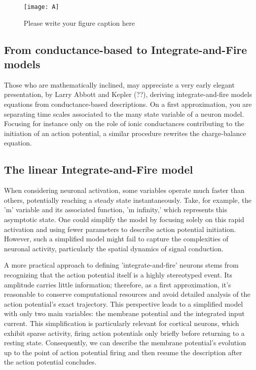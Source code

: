 \begin{figure}[t]
\sidecaption[t]
\centering
\texttt{[image: A]}
\caption{Please write your figure caption here}
\label{fig3:A1}       %
\end{figure}



\subsection{From conductance-based to Integrate-and-Fire models}

Those who are mathematically inclined, may appreciate a very early elegant presentation, by Larry Abbott and Kepler (??), deriving integrate-and-fire models equations from conductance-based descriptions. On a first approximation, you are separating time scales associated to the many state variable of a neuron model. Focusing for instance only on the role of ionic conductances contributing to the initiation of an action potential, a similar procedure rewrites the charge-balance equation.

\subsection{The linear Integrate-and-Fire model}

When considering neuronal activation, some variables operate much faster than others, potentially reaching a steady state instantaneously. Take, for example, the 'm' variable and its associated function, 'm infinity,' which represents this asymptotic state. One could simplify the model by focusing solely on this rapid activation and using fewer parameters to describe action potential initiation. However, such a simplified model might fail to capture the complexities of neuronal activity, particularly the spatial dynamics of signal conduction.

A more practical approach to defining 'integrate-and-fire' neurons stems from recognizing that the action potential itself is a highly stereotyped event. Its amplitude carries little information; therefore, as a first approximation, it's reasonable to conserve computational resources and avoid detailed analysis of the action potential's exact trajectory. This perspective leads to a simplified model with only two main variables: the membrane potential and the integrated input current. This simplification is particularly relevant for cortical neurons, which exhibit sparse activity, firing action potentials only briefly before returning to a resting state. Consequently, we can describe the membrane potential's evolution up to the point of action potential firing and then resume the description after the action potential concludes.


